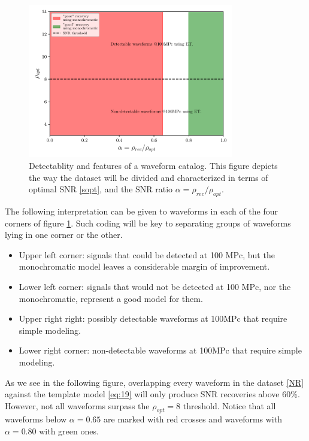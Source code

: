 \begin{figure}[hbt!]
\begin{center}
\includegraphics[width=0.8\textwidth, angle=0]{images/Data_analysis/results/schematics.pdf}
\captionsetup{width=0.8\textwidth}
\caption[Detectablity and features of a waveform catalog]{Detectablity and features of a waveform catalog. This figure depicts the way the dataset will be divided and characterized in terms of optimal SNR \ref{sopt}, and the SNR ratio $\alpha=\rho_{rec}/\rho_{opt}$.}
\label{regions}
\end{center} 
\end{figure}

\FloatBarrier


The following interpretation can be given to waveforms in each of the four corners of figure \ref{regions}. Such coding will be key to separating groups of waveforms lying in one corner or the other.


\begin{itemize}
\item Upper left corner: signals that could be detected at 100 MPc, but the monochromatic model leaves a considerable margin of improvement.
\item Lower left corner: signals that would not be detected at 100 MPc, nor the monochromatic, represent a good model for them.
\item 
Upper right right: possibly detectable waveforms at 100MPc that require simple modeling.
\item 
Lower right corner: non-detectable waveforms at 100MPc that require simple modeling.
\end{itemize}


As we see in the following figure, overlapping every waveform in the dataset \ref{NR} against the template model \ref{eq:19} will only produce SNR recoveries above 60\%. However, not all waveforms surpass the $\rho_{opt}=8$ threshold. Notice that all waveforms below $\alpha=0.65$ are marked with red crosses and waveforms with $\alpha=0.80$ with green ones.

